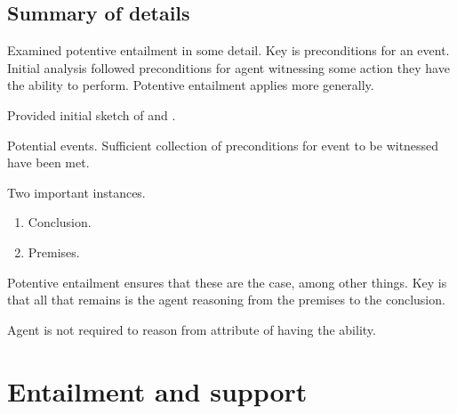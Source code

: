 \subsection{Summary of details}
\label{sec:summary-details}

\begin{note}[Summary]
  Examined potentive entailment in some detail.
  Key is preconditions for an event.
  Initial analysis followed preconditions for agent witnessing some action they have the ability to perform.
  Potentive entailment applies more generally.

  Provided initial sketch of \AR{} and \WR{}.
\end{note}

\begin{note}[To remember]
  Potential events.
  Sufficient collection of preconditions for event to be witnessed have been met.

  Two important instances.
  \begin{enumerate}
  \item Conclusion.
  \item Premises.
  \end{enumerate}
  Potentive entailment ensures that these are the case, among other things.
  Key is that all that remains is the agent reasoning from the premises to the conclusion.

  Agent is not required to reason from attribute of having the ability.
\end{note}

\section{Entailment and support}
\label{sec:entailment-support}


